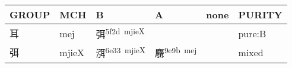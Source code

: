 \documentclass[14pt,a4paper]{scrartcl}
\begin{document}
\begin{longtable}[c]{@{}llllll@{}}
\toprule
\begin{minipage}[b]{0.14\columnwidth}\raggedright\strut
GROUP
\strut\end{minipage} &
\begin{minipage}[b]{0.14\columnwidth}\raggedright\strut
MCH
\strut\end{minipage} &
\begin{minipage}[b]{0.14\columnwidth}\raggedright\strut
B
\strut\end{minipage} &
\begin{minipage}[b]{0.14\columnwidth}\raggedright\strut
A
\strut\end{minipage} &
\begin{minipage}[b]{0.14\columnwidth}\raggedright\strut
none
\strut\end{minipage} &
\begin{minipage}[b]{0.14\columnwidth}\raggedright\strut
PURITY
\strut\end{minipage}\tabularnewline
\midrule
\endhead
\begin{minipage}[t]{0.14\columnwidth}\raggedright\strut
耳
\strut\end{minipage} &
\begin{minipage}[t]{0.14\columnwidth}\raggedright\strut
mej
\strut\end{minipage} &
\begin{minipage}[t]{0.14\columnwidth}\raggedright\strut
弭\textsuperscript{5f2d~mjieX}
\strut\end{minipage} &
\begin{minipage}[t]{0.14\columnwidth}\raggedright\strut
\strut\end{minipage} &
\begin{minipage}[t]{0.14\columnwidth}\raggedright\strut
\strut\end{minipage} &
\begin{minipage}[t]{0.14\columnwidth}\raggedright\strut
pure:B
\strut\end{minipage}\tabularnewline
\begin{minipage}[t]{0.14\columnwidth}\raggedright\strut
弭
\strut\end{minipage} &
\begin{minipage}[t]{0.14\columnwidth}\raggedright\strut
mjieX
\strut\end{minipage} &
\begin{minipage}[t]{0.14\columnwidth}\raggedright\strut
渳\textsuperscript{6e33~mjieX}
\strut\end{minipage} &
\begin{minipage}[t]{0.14\columnwidth}\raggedright\strut
麛\textsuperscript{9e9b~mej}
\strut\end{minipage} &
\begin{minipage}[t]{0.14\columnwidth}\raggedright\strut
\strut\end{minipage} &
\begin{minipage}[t]{0.14\columnwidth}\raggedright\strut
mixed
\strut\end{minipage}\tabularnewline
\bottomrule
\end{longtable}
\end{document}
